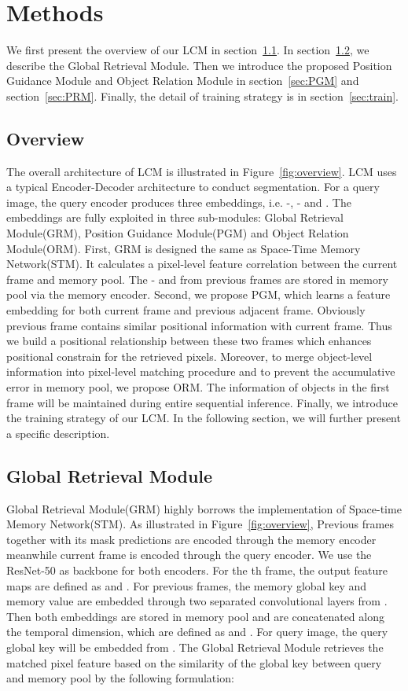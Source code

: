 \documentclass[final]{cvpr}
\begin{document}
\section{Methods}
We first present the overview of our LCM in section~\ref{sec:overview}. In section~\ref{sec:GRM}, we describe the Global Retrieval Module. Then we introduce the proposed Position Guidance Module and Object Relation Module in section~\ref{sec:PGM} and section~\ref{sec:PRM}. Finally, the detail of training strategy is in section~\ref{sec:train}.

\subsection{Overview}\label{sec:overview}
The overall architecture of LCM is illustrated in Figure~\ref{fig:overview}. LCM uses a typical Encoder-Decoder architecture to conduct segmentation. For a query image, the query encoder produces three embeddings, i.e. -, - and . The embeddings are fully exploited in three sub-modules: Global Retrieval Module(GRM), Position Guidance Module(PGM) and Object Relation Module(ORM). First, GRM is designed the same as Space-Time Memory Network(STM)\cite{STM}. It calculates a pixel-level feature correlation between the current frame and memory pool. 
The - and  from previous frames
are stored in memory pool via the memory encoder. Second, we propose PGM, which learns a feature embedding for both current frame and previous adjacent frame. Obviously previous frame contains similar positional information with current frame. Thus we build a positional relationship between these two frames which enhances positional constrain for the retrieved pixels. Moreover, to merge object-level information into pixel-level matching procedure and to prevent the accumulative error in memory pool, we propose ORM. The information of objects in the first frame will be maintained during entire sequential inference. Finally, we introduce the training strategy of our LCM. In the following section, we will further present a specific description. 


\subsection{Global Retrieval Module}\label{sec:GRM}
Global Retrieval Module(GRM) highly borrows the implementation of Space-time Memory Network(STM)\cite{STM}. As illustrated in Figure~\ref{fig:overview}, Previous frames together with its mask predictions are encoded through the memory encoder meanwhile current frame is encoded through the query encoder. We use the ResNet-50\cite{resnet} as backbone for both encoders. For the th frame, the output feature maps are defined as  and . 
For previous frames,
the memory global key  and memory value  are embedded through two separated  convolutional layers from . Then both embeddings are stored in memory pool and are concatenated along the temporal dimension, which are defined as  and . For query image, the query global key  will be embedded from . The Global Retrieval Module retrieves the matched pixel feature based on the similarity of the global key between query and memory pool by the following formulation:
\end{document}
